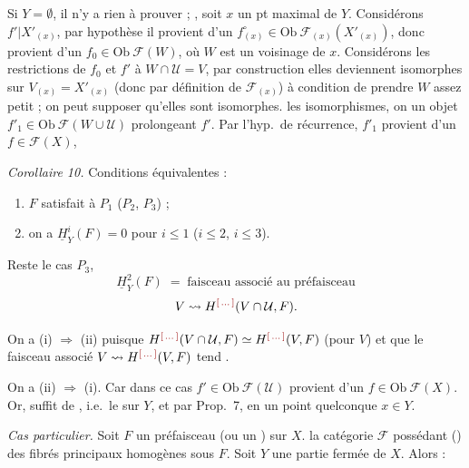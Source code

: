 \documentclass[11pt,a4paper]{article}
\begin{document}
 Si $Y = \emptyset$, il n'y a \ill{} rien à prouver ; \ill{},
soit $x$ un pt maximal de $Y$. Considérons $f' | X'_{(x)}$, par hypothèse il
provient d'un $f^{\circ}_{(x)} \in \mathrm{Ob}\ \mathcal{F}_{(x)}(X'_{(x)})$,
donc \ill{} provient d'un $f_0 \in \mathrm{Ob}\ \mathcal{F}(W)$, où $W$ est un
voisinage \ill{} de $x$. \struck{\ill{}} Considérons les restrictions de $f_0$
et $f'$ à $W \cap \mathcal{U} = V$, par construction elles deviennent
isomorphes sur $V_{(x)} = X'_{(x)}$ (donc \struck{\ill{}} par définition de
$\mathcal{F}_{(x)}$) à condition de prendre $W$ assez petit ; on peut supposer
qu'elles sont isomorphes. \ill{} les isomorphismes, on \ill{} un objet
$f'_1 \in \mathrm{Ob}\ \mathcal{F}(W \cup \mathcal{U})$ prolongeant $f'$. Par
l'hyp.\ de récurrence, $f'_1$ provient d'un $f \in \mathcal{F}(X)$, \ill{}

\ill{}

\emph{Corollaire 10.} Conditions équivalentes :
\begin{enumerate}
  \item[(i)] $F$ satisfait à $P_1$ ($P_2$, $P_3$) ;
  \item[(ii)] on a $\underline{H}^{i}_{Y}(F) = 0$ pour $i \leqslant 1$
        ($i \leqslant 2$, $i \leqslant 3$).
\end{enumerate}

Reste le cas $P_3$, \ill{}
\[
  \underline{H}^{2}_{Y}(F) \;=\; \text{faisceau associé au préfaisceau}
\]
\[
  V \rightsquigarrow H^{\ill}(V \cap \mathcal{U}, F).
\]


On a (i) $\Longrightarrow$ (ii) puisque
$H^{\ill}(V \cap \mathcal{U}, F) \simeq H^{\ill}(V, F)$ (pour \ill{} $V$) et
que le faisceau associé \ill{} $V \rightsquigarrow H^{\ill}(V, F)$ \ill{}
tend \ill{}.

On a (ii) $\Longrightarrow$ (i). Car dans ce cas \ill{}
$f' \in \mathrm{Ob}\ \mathcal{F}(\mathcal{U})$ provient d'un
$f \in \mathrm{Ob}\ \mathcal{F}(X)$.
Or, \ill{} suffit de \ill{} , i.e.\ le \ill{} sur $Y$,
\ill{} et \ill{} par Prop.\ 7, en \ill{} \ill{} un point quelconque
$x \in Y$.

\emph{Cas particulier.} Soit \struck{\ill{}} $F$ un préfaisceau \ill{}
 (ou un \ill{}) sur $X$. \ill{} la catégorie
$\mathcal{F}$ \ill{} possédant (\ill{}) \ill{} des fibrés principaux
homogènes \ill{} sous $F$. Soit $Y$ une partie fermée de $X$. Alors :
\end{document}
